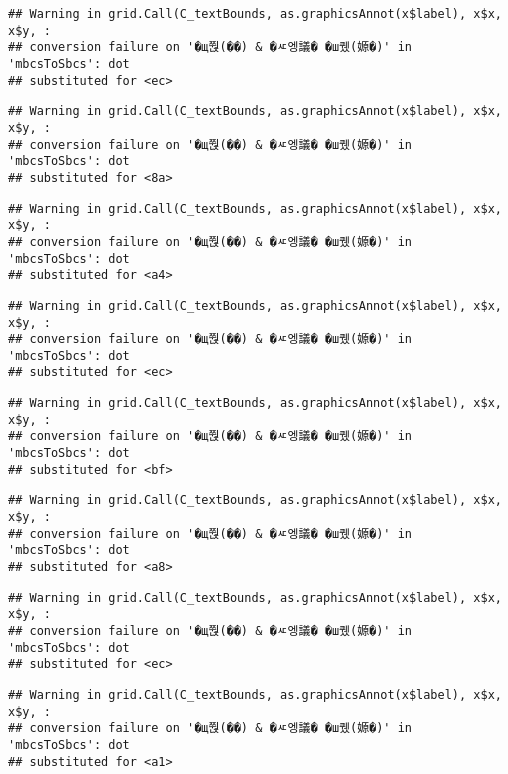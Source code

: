\documentclass[
]{article}
\begin{document}
\begin{verbatim}
## Warning in grid.Call(C_textBounds, as.graphicsAnnot(x$label), x$x, x$y, :
## conversion failure on '�щ쭩(��) & �ㅼ엥議� �ш퀬(嫄�)' in 'mbcsToSbcs': dot
## substituted for <ec>
\end{verbatim}

\begin{verbatim}
## Warning in grid.Call(C_textBounds, as.graphicsAnnot(x$label), x$x, x$y, :
## conversion failure on '�щ쭩(��) & �ㅼ엥議� �ш퀬(嫄�)' in 'mbcsToSbcs': dot
## substituted for <8a>
\end{verbatim}

\begin{verbatim}
## Warning in grid.Call(C_textBounds, as.graphicsAnnot(x$label), x$x, x$y, :
## conversion failure on '�щ쭩(��) & �ㅼ엥議� �ш퀬(嫄�)' in 'mbcsToSbcs': dot
## substituted for <a4>
\end{verbatim}

\begin{verbatim}
## Warning in grid.Call(C_textBounds, as.graphicsAnnot(x$label), x$x, x$y, :
## conversion failure on '�щ쭩(��) & �ㅼ엥議� �ш퀬(嫄�)' in 'mbcsToSbcs': dot
## substituted for <ec>
\end{verbatim}

\begin{verbatim}
## Warning in grid.Call(C_textBounds, as.graphicsAnnot(x$label), x$x, x$y, :
## conversion failure on '�щ쭩(��) & �ㅼ엥議� �ш퀬(嫄�)' in 'mbcsToSbcs': dot
## substituted for <bf>
\end{verbatim}

\begin{verbatim}
## Warning in grid.Call(C_textBounds, as.graphicsAnnot(x$label), x$x, x$y, :
## conversion failure on '�щ쭩(��) & �ㅼ엥議� �ш퀬(嫄�)' in 'mbcsToSbcs': dot
## substituted for <a8>
\end{verbatim}

\begin{verbatim}
## Warning in grid.Call(C_textBounds, as.graphicsAnnot(x$label), x$x, x$y, :
## conversion failure on '�щ쭩(��) & �ㅼ엥議� �ш퀬(嫄�)' in 'mbcsToSbcs': dot
## substituted for <ec>
\end{verbatim}

\begin{verbatim}
## Warning in grid.Call(C_textBounds, as.graphicsAnnot(x$label), x$x, x$y, :
## conversion failure on '�щ쭩(��) & �ㅼ엥議� �ш퀬(嫄�)' in 'mbcsToSbcs': dot
## substituted for <a1>
\end{verbatim}
\end{document}
